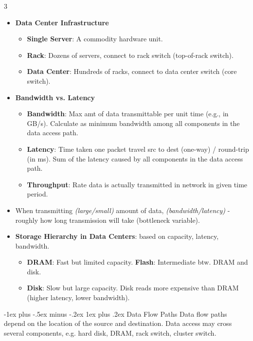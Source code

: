 \documentclass[a4paper, 9pt, landscape]{article}
\makeatletter
\renewcommand{\subsubsection}{\@startsection{subsubsection}{3}{0mm}%
                                {-1ex plus -.5ex minus -.2ex}%
                                {1ex plus .2ex}%
                                {\normalfont\small\bfseries}}
\makeatother
\begin{document}
\begin{multicols*}{3}
\begin{itemize}
\item \textbf{Data Center Infrastructure}
	\begin{itemize}
	    \item \textbf{Single Server}: A commodity hardware unit.
	    \item \textbf{Rack}: Dozens of servers, connect to rack switch (top-of-rack switch).
	    \item \textbf{Data Center}: Hundreds of racks, connect to data center switch (core switch).
	\end{itemize}
\item \textbf{Bandwidth vs. Latency}
	\begin{itemize}
	    \item \textbf{Bandwidth}: Max amt of data transmittable per unit time (e.g., in GB/s). Calculate as minimum bandwidth among all components in the data access path.
	    \item \textbf{Latency}: Time taken one packet travel src to dest (one-way) / round-trip (in ms). Sum of the latency caused by all components in the data access path.
	    \item \textbf{Throughput}: Rate data is actually transmitted in network in given time period.
	\end{itemize}
\item When transmitting \textit{(large/small)} amount of data, \textit{(bandwidth/latency)} - roughly how long transmission will take (bottleneck variable).
\item \textbf{Storage Hierarchy in Data Centers}: based on capacity, latency, bandwidth. 
	\begin{itemize}
	    \item \textbf{DRAM}: Fast but limited capacity. \textbf{Flash}: Intermediate btw. DRAM and disk.
	    \item \textbf{Disk}: Slow but large capacity. Disk reads more expensive than DRAM (higher latency, lower bandwidth).
	\end{itemize}
\end{itemize}


\subsubsection{Data Flow Paths}
Data flow paths depend on the location of the source and destination. Data access may cross several components, e.g. hard disk, DRAM, rack switch, cluster switch.


\end{multicols*}
\end{document}
